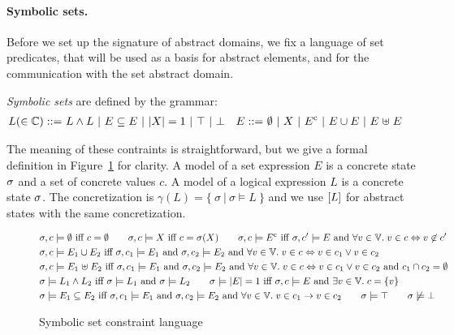 \paragraph{Symbolic sets.}
Before we set up the signature of abstract domains, we fix a language
of set predicates, that will be used as a basis for abstract elements,
and for the communication with the set abstract domain.
\begin{definition}
  \label{d:1:symsets}
  {\em Symbolic sets} are defined by the grammar:
  \begin{align*}
    L (\in \mathbb{C}) ::=
    & \ L \wedge L \
    | \ E \subseteq E \
    | \ |{X}| = 1 \
    | \ \top \
    | \ \bot
    & E ::=
    & \ \emptyset \ | \ X \ | \ {E}^{\mathrm{c}} \ | \ E \cup E \ | \ E \mathrel{\uplus} E
  \end{align*}
\end{definition}
The meaning of these contraints is straightforward, but we give a formal
definition in Figure~\ref{f:4:symsets} for clarity.
A model of a set expression $E$ is a concrete state $\sigma$ and a set
of concrete values $c$.
A model of a logical expression $L$ is a concrete state $\sigma$.
The concretization is $\gamma(L) = \{\ \sigma \ |\  \sigma \models L\ \}$
and we use $[{L}]$ for abstract states with the same concretization.
\begin{figure}[t]
  \begin{align*}
    & \sigma, c \models \emptyset \textrm{ iff } c = \emptyset
    \qquad
    \sigma, c \models X \textrm{ iff } c = \sigma(X)
    \qquad \sigma, c \models {E}^{\mathrm{c}}
    \textrm{ iff }
    \sigma, c' \models{E}
    \textrm{ and } \forall v \in \mathbb{V}.
    \; v \in c \Leftrightarrow v \not\in c'
    \\
    & \sigma, c \models E_1 \cup E_2
    \textrm{ iff }
    \sigma, c_1 \models E_1
    \textrm{ and } \sigma, c_2 \models E_2
    \textrm{ and }
    \forall v \in \mathbb{V}. \; v \in c \Leftrightarrow v \in c_1 \vee
    v \in c_2
    \\
    & \sigma, c \models E_1 \mathrel{\uplus} E_2
    \textrm{ iff }
    \sigma, c_1 \models E_1
    \textrm{ and } \sigma, c_2 \models E_2
    \textrm{ and }
    \forall v \in \mathbb{V}. \; v \in c \Leftrightarrow v \in c_1 \vee
    v \in c_2
    \textrm{ and } c_1 \cap c_2 = \emptyset
    \\
    & \sigma \models L_1 \wedge L_2
    \textrm{ iff }
    \sigma \models L_1 \textrm{ and } \sigma \models L_2
    \qquad
    \sigma \models |{E}| = 1
    \textrm{ iff }
    \sigma, c \models E \textrm{ and } \exists v \in \mathbb{V}. \; c = \{ v \}
    \\
    & \sigma \models E_1 \subseteq E_2
    \textrm{ iff }
    \sigma, c_1 \models E_1 \textrm{ and } \sigma, c_2 \models E_2
    \textrm{ and } \forall v \in \mathbb{V}. \; v \in c_1 \rightarrow v \in c_2
    \qquad \sigma \models \top
    \qquad \sigma \not\models \bot
  \end{align*}
  \caption{Symbolic set constraint language}
  \label{f:4:symsets}
\end{figure}
